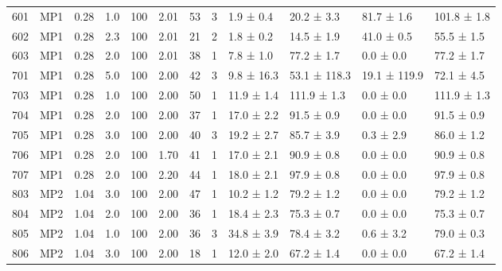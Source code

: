 \begin{table}
{\begin{tabular}{llllllllllll}
            601 &           MP1 &        0.28 &       1.0 &              100 &            2.01 &  53 &           3 &   1.9 ± 0.4 &   20.2 ± 3.3 &   81.7 ± 1.6 & 101.8 ± 1.8 \\
            602 &           MP1 &        0.28 &       2.3 &              100 &            2.01 &  21 &           2 &   1.8 ± 0.2 &   14.5 ± 1.9 &   41.0 ± 0.5 &  55.5 ± 1.5 \\
            603 &           MP1 &        0.28 &       2.0 &              100 &            2.01 &  38 &           1 &   7.8 ± 1.0 &   77.2 ± 1.7 &    0.0 ± 0.0 &  77.2 ± 1.7 \\
            701 &           MP1 &        0.28 &       5.0 &              100 &            2.00 &  42 &           3 &  9.8 ± 16.3 & 53.1 ± 118.3 & 19.1 ± 119.9 &  72.1 ± 4.5 \\
            703 &           MP1 &        0.28 &       1.0 &              100 &            2.00 &  50 &           1 &  11.9 ± 1.4 &  111.9 ± 1.3 &    0.0 ± 0.0 & 111.9 ± 1.3 \\
            704 &           MP1 &        0.28 &       2.0 &              100 &            2.00 &  37 &           1 &  17.0 ± 2.2 &   91.5 ± 0.9 &    0.0 ± 0.0 &  91.5 ± 0.9 \\
            705 &           MP1 &        0.28 &       3.0 &              100 &            2.00 &  40 &           3 &  19.2 ± 2.7 &   85.7 ± 3.9 &    0.3 ± 2.9 &  86.0 ± 1.2 \\
            706 &           MP1 &        0.28 &       2.0 &              100 &            1.70 &  41 &           1 &  17.0 ± 2.1 &   90.9 ± 0.8 &    0.0 ± 0.0 &  90.9 ± 0.8 \\
            707 &           MP1 &        0.28 &       2.0 &              100 &            2.20 &  44 &           1 &  18.0 ± 2.1 &   97.9 ± 0.8 &    0.0 ± 0.0 &  97.9 ± 0.8 \\
            803 &           MP2 &        1.04 &       3.0 &              100 &            2.00 &  47 &           1 &  10.2 ± 1.2 &   79.2 ± 1.2 &    0.0 ± 0.0 &  79.2 ± 1.2 \\
            804 &           MP2 &        1.04 &       2.0 &              100 &            2.00 &  36 &           1 &  18.4 ± 2.3 &   75.3 ± 0.7 &    0.0 ± 0.0 &  75.3 ± 0.7 \\
            805 &           MP2 &        1.04 &       1.0 &              100 &            2.00 &  36 &           3 &  34.8 ± 3.9 &   78.4 ± 3.2 &    0.6 ± 3.2 &  79.0 ± 0.3 \\
            806 &           MP2 &        1.04 &       3.0 &              100 &            2.00 &  18 &           1 &  12.0 ± 2.0 &   67.2 ± 1.4 &    0.0 ± 0.0 &  67.2 ± 1.4 \\

\end{tabular}}
\end{table}
